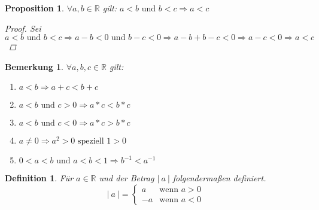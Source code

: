 \documentclass[a4paper,titlepage,oneside]{article}
\def\R{\ensuremath{\mathbb{R}} }
\def\fa{\ensuremath{\forall}}
\newcommand{\abs}[1]{\ensuremath{\left|\:#1\:\right|}}
\theoremstyle{thmstyle}
\newtheorem{prop}[satz]{Proposition}
\newtheorem{defi}[satz]{Definition}
\newtheorem{bem}[satz]{Bemerkung}
\begin{document}
\begin{prop}
\(\fa a, b \in \R \) gilt: \(a < b \text{ und } b < c \Rightarrow a < c\)
\begin{proof}
Sei \( a < b \text{ und } b < c \Rightarrow a - b < 0  \text{ und } b - c < 0 \Rightarrow a - b + b - c < 0 \Rightarrow a - c < 0 \Rightarrow a < c\)
\end{proof}
\end{prop}

\begin{bem}
\(\fa a, b, c \in \R\) gilt:
\begin{enumerate}[label=\alph*)]
\item \(a < b \Rightarrow a + c < b + c\)
\item \(a < b \text{ und } c > 0 \Rightarrow a * c < b * c\)
\item \(a < b \text{ und } c < 0 \Rightarrow a * c > b * c\)
\item \(a \ne 0 \Rightarrow a^2 > 0 \text{ speziell } 1 > 0\)
\item \(0 < a < b \text{ und } a < b < 1 \Rightarrow b^{-1} < a^{-1}\)
\end{enumerate}
\end{bem}

\begin{defi}
Für \(a \in \R\) und der Betrag \abs{a} folgendermaßen definiert. 
\[\abs{a} = \begin{cases}
 a & \text{wenn } a > 0\\
-a & \text{wenn } a < 0
\end{cases}\]
\end{defi}
\end{document}
